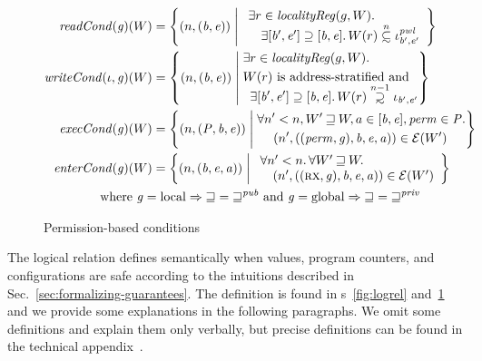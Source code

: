 \documentclass{llncs}
\newcommand{\sectionname}{Sec.}
\newcommand\subsetsim{\mathrel{\ooalign{\raise.2ex\hbox{$\subset$}\cr
      \hidewidth\lower.8ex\hbox{\scalebox{0.9}{$\sim$}}\hidewidth\cr}}}
\newcommand\supsetsim{\mathrel{\ooalign{\raise.2ex\hbox{$\supset$}\cr
      \hidewidth\lower.8ex\hbox{\scalebox{0.9}{$\sim$}}\hidewidth\cr}}}
\newcommand{\nsubsim}[1][n]{\stackrel{\tiny{#1}}{\subsetsim}}
\newcommand{\nsupsim}[1][n]{\stackrel{\tiny{#1}}{\supsetsim}}
\newcommand\dominique[1]{{\color{purple} \sf \footnotesize {DD: #1}}\\}
\renewcommand\dominique[1]{}
\newcommand{\var}[1]{\mathit{#1}}
\newcommand{\gl}{\var{g}}
\newcommand{\addr}{\var{a}}
\newcommand{\start}{\var{b}}
\newcommand{\addrend}{\var{e}}
\newcommand{\perm}{\var{perm}}
\newcommand{\pwl}{\var{pwl}}
\newcommand{\plainfun}[2]{
  \ifthenelse{\equal{#2}{}}
  {\mathit{#1}}
  {\mathit{#1}(#2)}
}
\newcommand{\readCond}[1]{\plainfun{readCond}{#1}}
\newcommand{\writeCond}[1]{\plainfun{writeCond}{#1}}
\newcommand{\execCond}[1]{\plainfun{execCond}{#1}}
\newcommand{\entryCond}[1]{\plainfun{enterCond}{#1}}
\newcommand{\future}{\mathbin{\sqsupseteq}}
\newcommand{\futurewk}{\mathbin{\sqsupseteq}^{\var{pub}}}
\newcommand{\futurestr}{\mathbin{\sqsupseteq}^{\var{priv}}}
\newcommand{\asmType}{\plaindom{AsmType}}
\newcommand{\plaindom}[1]{\mathrm{#1}}
\newcommand{\intr}[2]{\mathcal{#1}}
\newcommand{\exprintr}[1]{\intr{E}{#1}}
\newcommand{\stder}{\exprintr{\asmType}}
\newcommand{\npair}[2][n]{\left(#1,#2 \right)}
\newcommand{\npairP}[2][n]{(#1,#2)}
\newcommand{\plainperm}[1]{\textsc{#1}}
\newcommand{\exec}{\plainperm{rx}}
\newcommand{\plainlocality}[1]{\mathrm{#1}}
\newcommand{\local}{\plainlocality{local}}
\newcommand{\glob}{\plainlocality{global}}
\begin{document}
{\begin{figure}[htbp]
  \centering
  \begin{align*}
   \readCond{}(\gl)(W) &=  \left\{ \npair{(\start,\addrend)} \; \middle| \;
    \begin{array}{l}
       \exists r \in \var{localityReg}(g,W) \ldotp \\
\quad   \exists [\start',\addrend'] \supseteq [\start,\addrend] \ldotp W(r)\nsubsim[n] \iota_{\start',\addrend'}^\pwl 
    \end{array}
    \right\}\\
   \writeCond{}(\iota,\gl)(W) &=  \left\{
    \npair{(\start,\addrend)}
    \; \middle| \;
    \begin{aligned}
      & \exists r \in \var{localityReg}(g,W) \ldotp \\
      & W(r) \text{ is address-stratified and} \\[-0.2cm]
      & \;\; \exists [\start',\addrend'] \supseteq [\start,\addrend] \ldotp W(r)\nsupsim[n-1] \iota_{\start',\addrend'}
    \end{aligned} \right\}\\
   \execCond{}(\gl)(W) &= 
    \left\{
      \npairP{(\var{P}, \start,\addrend)}
     \; \middle| \;
    \begin{aligned}
      & \forall n' < n, W' \future W, a \in [\start,\addrend], \perm \in \var{P} \ldotp \\
      & \;\;\;\; \npair[n']{((\perm,\gl),\start,\addrend,\addr)} \in \stder(W')\\
    \end{aligned} \right\} \\
   \entryCond{}(\gl)(W) &= 
    \left\{ \npair{(\start,\addrend,\addr)} \; \middle| \;
    \begin{array}{l}
      \forall n' < n \ldotp \forall W' \future W \ldotp\\
      \quad \npair[n']{((\exec,\gl),\start,\addrend,\addr)} \in \stder(W')
    \end{array}
    \right\} \\
   \text{where } \gl = \local \Rightarrow \future = \futurewk \text{ and } \gl = \glob \Rightarrow \future = \futurestr \span
  \end{align*}
\caption{Permission-based conditions}
\label{fig:perm-conds}
\end{figure}
}
The logical relation defines semantically when values, program counters, and
configurations are safe according to the intuitions described in
\sectionname~\ref{sec:formalizing-guarantees}. The definition is found in
\figurename{}s~\ref{fig:logrel} and~\ref{fig:perm-conds} and we provide some
explanations in the following paragraphs. We omit some definitions and explain
them only verbally, but precise definitions can be found in the technical
appendix~\cite{technical_appendix}.
\end{document}
